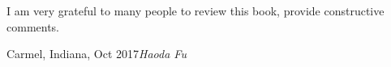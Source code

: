 %
%

\foreword



I am very grateful to many people to review this book, provide constructive comments.


\vspace{\baselineskip}
\begin{flushright}\noindent
Carmel, Indiana, Oct 2017\hfill {\it Haoda Fu}\\
\end{flushright}


